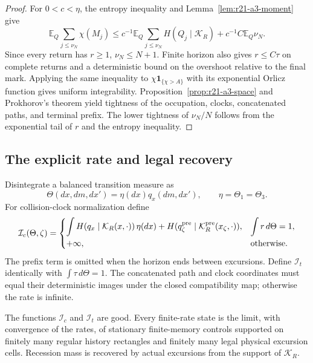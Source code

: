 \begin{proof}
For $0<c<\eta$, the entropy inequality and
Lemma~\ref{lem:r21-a3-moment} give
\[
 \mathbb E_Q\sum_{j\le\nu_N}\chi(M_j)
 \le c^{-1}\mathbb E_Q\sum_{j\le\nu_N}H(Q_j\mid\mathcal K_R)
 +c^{-1}C\mathbb E_Q\nu_N.
\]
Since every return has $r\ge1$, $\nu_N\le N+1$.  Finite horizon also gives
$r\le C\tau$ on complete returns and a deterministic bound on the overshoot
relative to the final mark.  Applying the same inequality to
$\chi\mathbf1_{\{\chi>A\}}$ with its exponential Orlicz function gives
uniform integrability.  Proposition~\ref{prop:r21-a3-space} and Prokhorov's
theorem yield tightness of the occupation, clocks, concatenated paths, and
terminal prefix.  The lower tightness of $\nu_N/N$ follows from the
exponential tail of $r$ and the entropy inequality.
\end{proof}

\subsection{The explicit rate and legal recovery}

Disintegrate a balanced transition measure as
\[
 \Theta(dx,dm,dx')=\eta(dx)q_x(dm,dx'),
 \qquad \eta=\Theta_1=\Theta_3.
\]
For collision-clock normalization define
\[
 \mathcal I_c(\Theta,\zeta)=
 \begin{cases}
 \displaystyle\int H(q_x\mid\mathcal K_R(x,\cdot))\,\eta(dx)
 +H(q^{\rm pre}_\zeta\mid\mathcal K_R^{\rm pre}(x_\zeta,\cdot)),
 &\displaystyle\int r\,d\Theta=1,\\[2mm]
 +\infty,&\text{otherwise}.
 \end{cases}
\]
The prefix term is omitted when the horizon ends between excursions.  Define
$\mathcal I_t$ identically with $\int\tau\,d\Theta=1$.  The concatenated path
and clock coordinates must equal their deterministic images under the closed
compatibility map; otherwise the rate is infinite.

\begin{theorem}
\label{thm:r21-a3-recovery}
The functions $\mathcal I_c$ and $\mathcal I_t$ are good.  Every finite-rate
state is the limit, with convergence of the rates, of stationary finite-memory
controls supported on finitely many regular history rectangles and finitely
many legal physical excursion cells.  Recession mass is recovered by actual
excursions from the support of $\mathcal K_R$.
\end{theorem}

